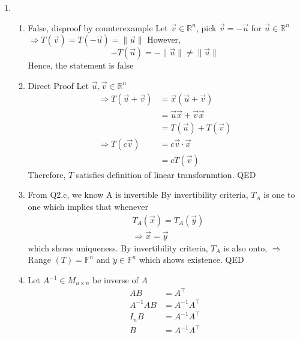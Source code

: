 \documentclass[11pt]{article}
\begin{document}
\begin{enumerate}[{\bf Q1.}]
		\newpage
		
		\item
		\begin{enumerate}
			\item 
			False, disproof by counterexample \newline
			Let $\vec{v} \in \mathbb{R}^n$, pick $\vec{v}=-\vec{u}$ for $\vec{u} \in \mathbb{R}^n$
			$\Rightarrow T(\vec{v})=T(-\vec{u})=\|\vec{u}\|$
			However,
			$$
			-T(\vec{u})=-\|\vec{u}\| \neq\|\vec{u}\|
			$$
			Hence, the statement is false
			\item 
			Direct Proof \newline
			Let $\vec{u}, \vec{v} \in \mathbb{R}^n$
			$$
			\begin{aligned}
			\Rightarrow T(\vec{u}+\vec{v}) & =\vec{x}(\vec{u}+\vec{v}) \\
			& =\vec{u} \vec{x}+\vec{v} \vec{x} \\
			& =T(\vec{u})+T(\vec{v}) \\
			\Rightarrow T(c \vec{v}) & =c \vec{v} \cdot \vec{x} \\
			& =c T(\vec{v})
			\end{aligned}
			$$
			Therefore, $T$ satisfies definition of linear transfornmtion. \newline 
			QED
			\item 
			From Q2.c, we know A is invertible \newline 
			By invertibility criteria, $T_A$ is one to one which implies that whenever
			$$
			\begin{aligned}
			& T_A(\vec{x})=T_A(\vec{y}) \\
			& \Rightarrow \vec{x}=\vec{y}
			\end{aligned}
			$$
			which shows uniqueness. \newline
			By invertibility criteria, $T_A$ is also onto, \newline
			$\Rightarrow$ Range $(T)=\mathbb{F}^n$ and $\ddot{y} \in \mathbb{F}^n$ which shows existence.
			\newline QED
			\item 
			Let $A^{-1} \in M_{u \times n}$ be inverse of $A$
			$$
			\begin{aligned}
			A B & =A^{\top} \\
			A^{-1} A B & =A^{-1} A^{\top} \\
			I_n B & =A^{-1} A^{\top} \\
			B & =A^{-1} A^{\top} \\

\end{aligned}$$
\end{enumerate}
\end{enumerate}
\end{document}
